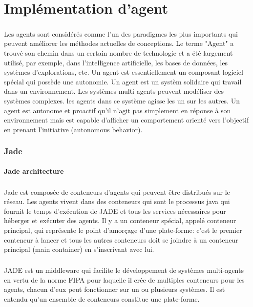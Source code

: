 \chapter{ Implémentation d'agent }
\label{Implementation_d_agent}
\paragraph{}
Les agents sont considérés comme l'un des paradigmes les plus importants qui peuvent améliorer les méthodes actuelles de conceptions. Le terme "Agent" a trouvé son chemin dans un certain nombre de technologie et a été largement utilisé, par exemple, dans l'intelligence artificielle, les bases de données, les systèmes d'explorations, etc. Un agent est essentiellement un composant logiciel spécial qui possède une autonomie. Un agent est un systèm solidaire qui travail dans un environnement. Les systèmes multi-agents peuvent modéliser des systèmes complexes. les agents dans ce système agisse les un sur les autres. Un agent est autonome et proactif qu'il n'agit pas simplement en réponse à son environnement mais est capable d'afficher un comportement orienté vers l'objectif en prenant l'initiative (autonomous behavior).

\subsection{ Jade }
\subsubsection{Jade architecture}
\paragraph{}
Jade est composée de conteneurs d'agents qui peuvent être distribués sur le réseau. Les agents vivent dans des conteneurs qui sont le processus java qui fournit le temps d'exécution de JADE et tous les services nécessaires pour héberger et exécuter des agents. Il y a un conteneur spécial, appelé conteneur principal, qui représente le point d'amorçage d'une plate-forme: c'est le premier conteneur à lancer et tous les autres conteneurs doit se joindre à un conteneur principal (main container) en s'inscrivant avec lui.
\paragraph{}
JADE est un middleware qui facilite le développement de systèmes multi-agents en vertu de la norme FIPA pour laquelle il crée de multiples conteneurs pour les agents, chacun d'eux peut fonctionner sur un ou plusieurs systèmes. Il est entendu qu'un ensemble de conteneurs constitue une plate-forme.

